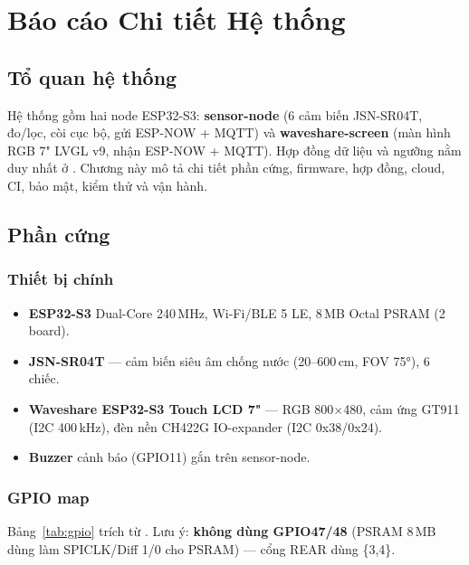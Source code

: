 \chapter{Báo cáo Chi tiết Hệ thống}
\label{ch:system}

\section{Tổ quan hệ thống}
\label{sec:sys-overview}

Hệ thống gồm hai node ESP32-S3: \textbf{sensor-node} (6 cảm biến JSN-SR04T, đo/lọc, còi
cục bộ, gửi ESP-NOW + MQTT) và \textbf{waveshare-screen} (màn hình RGB 7" LVGL v9, nhận
ESP-NOW + MQTT). Hợp đồng dữ liệu và ngưỡng nằm duy nhất ở .
Chương này mô tả chi tiết phần cứng, firmware, hợp đồng, cloud, CI, bảo mật, kiểm thử
và vận hành.

\section{Phần cứng}
\label{sec:sys-hw}

\subsection{Thiết bị chính}
\begin{itemize}
\item \textbf{ESP32-S3} Dual-Core 240\,MHz, Wi-Fi/BLE 5 LE, 8\,MB Octal PSRAM (2 board).
\item \textbf{JSN-SR04T} — cảm biến siêu âm chống nước (20--600\,cm, FOV 75°), 6 chiếc.
\item \textbf{Waveshare ESP32-S3 Touch LCD 7"} — RGB 800$\times$480, cảm ứng GT911 (I2C
  400\,kHz), đèn nền CH422G IO-expander (I2C 0x38/0x24).
\item \textbf{Buzzer} cảnh báo (GPIO11) gắn trên sensor-node.
\end{itemize}

\subsection{GPIO map}
Bảng~\ref{tab:gpio} trích từ . Lưu ý: \textbf{không dùng GPIO47/48}
(PSRAM 8\,MB dùng làm SPICLK/Diff 1/0 cho PSRAM) — cổng REAR dùng \{3,4\}.

